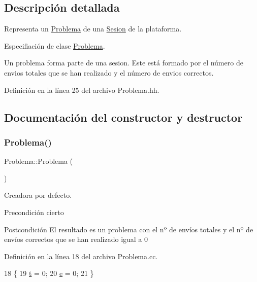 \subsection{Descripción detallada}
Representa un \mbox{\hyperlink{class_problema}{Problema}} de una \mbox{\hyperlink{class_sesion}{Sesion}} de la plataforma. 

Especifiación de clase \mbox{\hyperlink{class_problema}{Problema}}.

Un problema forma parte de una sesion. Este está formado por el número de envios totales que se han realizado y el número de envios correctos. 

Definición en la línea 25 del archivo Problema.\+hh.



\subsection{Documentación del constructor y destructor}
\mbox{\label{class_problema_a9d81af5f3f42a1b4354ad8f3c022fca3}} 
\subsubsection{\texorpdfstring{Problema()}{Problema()}}
{\footnotesize\ttfamily Problema\+::\+Problema (\begin{DoxyParamCaption}{ }\end{DoxyParamCaption})}



Creadora por defecto. 

\begin{DoxyPrecond}{Precondición}
cierto 
\end{DoxyPrecond}
\begin{DoxyPostcond}{Postcondición}
El resultado es un problema con el nº de envíos totales y el nº de envíos correctos que se han realizado igual a 0 
\end{DoxyPostcond}


Definición en la línea 18 del archivo Problema.\+cc.


\begin{DoxyCode}
18                          \{
19         \mbox{\hyperlink{class_problema_a968bd889d6dc627efb59318ccc2eed7d}{t}} = 0;
20         \mbox{\hyperlink{class_problema_a725a4c8c4faf4d1a646ef7ce9db37211}{e}} = 0;
21       \}
\end{DoxyCode}


